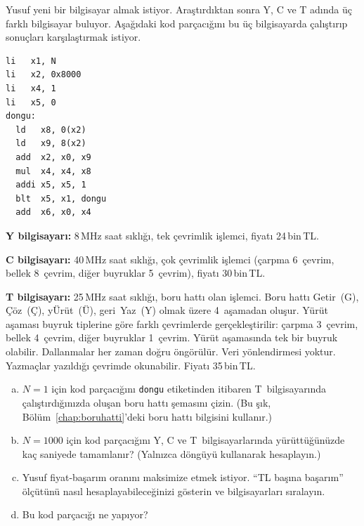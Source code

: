 \begin{alistirma}[\zor]
Yusuf yeni bir bilgisayar almak istiyor. Araştırdıktan sonra Y, C ve T adında üç farklı bilgisayar buluyor. Aşağıdaki kod parçacığını bu üç bilgisayarda çalıştırıp sonuçları karşılaştırmak istiyor.

\begin{lstlisting}[style=riscv, style=alistirma-kod]
li   x1, N
li   x2, 0x8000
li   x4, 1
li   x5, 0
dongu:
  ld   x8, 0(x2)
  ld   x9, 8(x2)
  add  x2, x0, x9
  mul  x4, x4, x8
  addi x5, x5, 1
  blt  x5, x1, dongu
  add  x6, x0, x4
\end{lstlisting}

\textbf{Y bilgisayarı:} 8\,MHz saat sıklığı, tek çevrimlik işlemci, fiyatı 24\,bin\,TL.

\textbf{C bilgisayarı:} 40\,MHz saat sıklığı, çok çevrimlik işlemci (çarpma 6~çevrim, bellek 8~çevrim, diğer buyruklar 5~çevrim), fiyatı 30\,bin\,TL.

\textbf{T bilgisayarı:} 25\,MHz saat sıklığı, boru hattı olan işlemci. Boru hattı Getir~(G), Çöz~(Ç), yÜrüt~(Ü), geri~Yaz~(Y) olmak üzere 4~aşamadan oluşur. Yürüt aşaması buyruk tiplerine göre farklı çevrimlerde gerçekleştirilir: çarpma 3~çevrim, bellek 4~çevrim, diğer buyruklar 1~çevrim. Yürüt aşamasında tek bir buyruk olabilir. Dallanmalar her zaman doğru öngörülür. Veri yönlendirmesi yoktur. Yazmaçlar yazıldığı çevrimde okunabilir. Fiyatı 35\,bin\,TL.

\begin{enumerate}[(a)]
    \item $N = 1$ için kod parçacığını \texttt{dongu} etiketinden itibaren T~bilgisayarında çalıştırdığınızda oluşan boru hattı şemasını çizin. (Bu şık, Bölüm~\ref{chap:boruhatti}'deki boru hattı bilgisini kullanır.)
    \item $N = 1000$ için kod parçacığını Y, C ve T~bilgisayarlarında yürüttüğünüzde kaç saniyede tamamlanır? (Yalnızca döngüyü kullanarak hesaplayın.)
    \item Yusuf fiyat-başarım oranını maksimize etmek istiyor. ``TL başına başarım'' ölçütünü nasıl hesaplayabileceğinizi gösterin ve bilgisayarları sıralayın.
    \item Bu kod parçacığı ne yapıyor?
\end{enumerate}
\end{alistirma}


